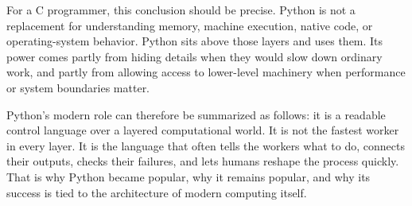 For a C programmer, this conclusion should be precise. Python is not a replacement for understanding memory, machine execution, native code, or operating-system behavior. Python sits above those layers and uses them. Its power comes partly from hiding details when they would slow down ordinary work, and partly from allowing access to lower-level machinery when performance or system boundaries matter.

Python's modern role can therefore be summarized as follows: it is a readable control language over a layered computational world. It is not the fastest worker in every layer. It is the language that often tells the workers what to do, connects their outputs, checks their failures, and lets humans reshape the process quickly. That is why Python became popular, why it remains popular, and why its success is tied to the architecture of modern computing itself.